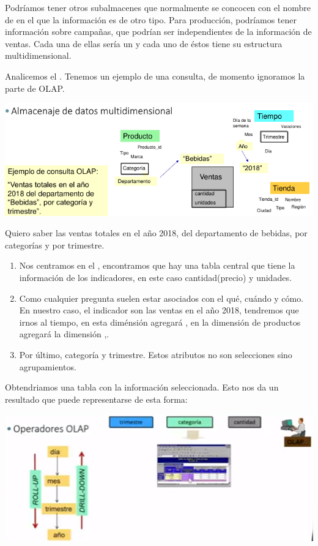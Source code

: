 Podríamos tener otros subalmacenes que normalmente se concocen con el nombre de  en el que la información es de otro tipo. Para producción, podríamos tener información sobre campañas, que podrían ser independientes de la información de ventas. Cada una de ellas sería un  y cada uno de éstos tiene su estructura multidimensional.

Analicemos el . Tenemos un ejemplo de una consulta, de momento ignoramos la parte de OLAP. 

\begin{center}
    \includegraphics[scale=.8]{images/mod01-11.png}
\end{center}

Quiero saber las ventas totales en el año 2018, del departamento de bebidas, por categorías y por trimestre.

\begin{enumerate}
    \item Nos centramos en el , encontramos que hay una tabla central que tiene la información de los indicadores, en este caso cantidad(precio) y unidades. 
    \item Como cualquier pregunta suelen estar asociados con el qué, cuándo y cómo. En nuestro caso, el indicador son las ventas en el año 2018, tendremos que irnos al tiempo, en esta diménsión agregará , en la dimensión de productos agregará la dimensión ,.
    \item Por último, categoría y trimestre. Estos atributos no son selecciones sino agrupamientos.
\end{enumerate}

Obtendriamos una tabla con la información seleccionada. Esto nos da un resultado que puede representarse de esta forma:

\begin{center}
    \includegraphics[scale=.8]{images/mod01-12.png}
\end{center}

